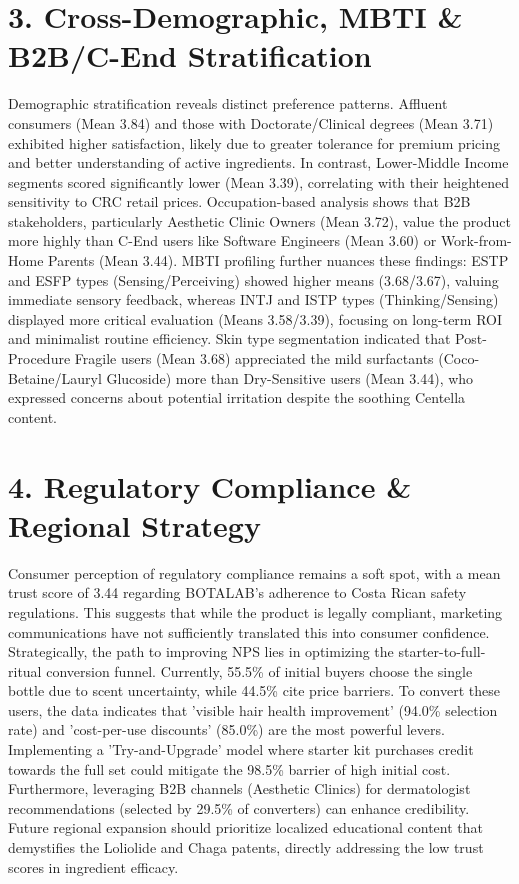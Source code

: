 \documentclass[10pt,twocolumn,a4paper]{article}
\begin{document}
\section{3. Cross-Demographic, MBTI \& B2B/C-End Stratification}
Demographic stratification reveals distinct preference patterns. Affluent consumers (Mean 3.84) and those with Doctorate/Clinical degrees (Mean 3.71) exhibited higher satisfaction, likely due to greater tolerance for premium pricing and better understanding of active ingredients. In contrast, Lower-Middle Income segments scored significantly lower (Mean 3.39), correlating with their heightened sensitivity to CRC retail prices. Occupation-based analysis shows that B2B stakeholders, particularly Aesthetic Clinic Owners (Mean 3.72), value the product more highly than C-End users like Software Engineers (Mean 3.60) or Work-from-Home Parents (Mean 3.44). MBTI profiling further nuances these findings: ESTP and ESFP types (Sensing/Perceiving) showed higher means (3.68/3.67), valuing immediate sensory feedback, whereas INTJ and ISTP types (Thinking/Sensing) displayed more critical evaluation (Means 3.58/3.39), focusing on long-term ROI and minimalist routine efficiency. Skin type segmentation indicated that Post-Procedure Fragile users (Mean 3.68) appreciated the mild surfactants (Coco-Betaine/Lauryl Glucoside) more than Dry-Sensitive users (Mean 3.44), who expressed concerns about potential irritation despite the soothing Centella content.
\section{4. Regulatory Compliance \& Regional Strategy}
Consumer perception of regulatory compliance remains a soft spot, with a mean trust score of 3.44 regarding BOTALAB’s adherence to Costa Rican safety regulations. This suggests that while the product is legally compliant, marketing communications have not sufficiently translated this into consumer confidence. Strategically, the path to improving NPS lies in optimizing the starter-to-full-ritual conversion funnel. Currently, 55.5\% of initial buyers choose the single bottle due to scent uncertainty, while 44.5\% cite price barriers. To convert these users, the data indicates that 'visible hair health improvement' (94.0\% selection rate) and 'cost-per-use discounts' (85.0\%) are the most powerful levers. Implementing a 'Try-and-Upgrade' model where starter kit purchases credit towards the full set could mitigate the 98.5\% barrier of high initial cost. Furthermore, leveraging B2B channels (Aesthetic Clinics) for dermatologist recommendations (selected by 29.5\% of converters) can enhance credibility. Future regional expansion should prioritize localized educational content that demystifies the Loliolide and Chaga patents, directly addressing the low trust scores in ingredient efficacy.
\end{document}
